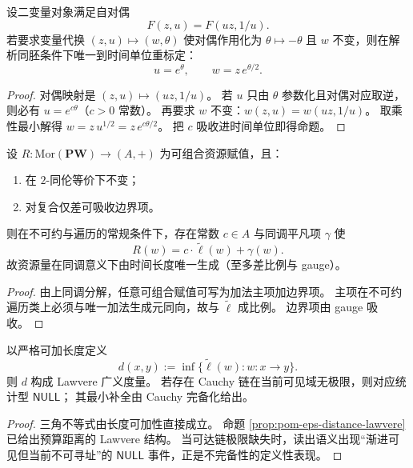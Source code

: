 \begin{proposition}\label{prop:xi-completed-coordinate-rigidity-time-reversal}
设二变量对象满足自对偶
\[
F(z,u)=F(uz,1/u).
\]
若要求变量代换 \((z,u)\mapsto (w,\theta)\) 使对偶作用化为
\(
\theta\mapsto-\theta
\)
且 \(w\) 不变，则在解析同胚条件下唯一到时间单位重标定：
\[
u=e^{\theta},
\qquad
w=z\,e^{\theta/2}.
\]
\end{proposition}

\begin{proof}
对偶映射是 \((z,u)\mapsto(uz,1/u)\)。
若 \(u\) 只由 \(\theta\) 参数化且对偶对应取逆，则必有 \(u=e^{c\theta}\)（\(c>0\) 常数）。
再要求 \(w\) 不变：\(w(z,u)=w(uz,1/u)\)。
取乘性最小解得 \(w=z\,u^{1/2}=z\,e^{c\theta/2}\)。
把 \(c\) 吸收进时间单位即得命题。
\end{proof}

\begin{theorem}\label{thm:xi-time-initial-generator-for-resources}
设 \(R:\mathrm{Mor}(\mathbf{PW})\to (A,+)\) 为可组合资源赋值，且：
\begin{enumerate}
  \item 在 \(2\)-同伦等价下不变；
  \item 对复合仅差可吸收边界项。
\end{enumerate}
则在不可约与遍历的常规条件下，存在常数 \(c\in A\) 与同调平凡项 \(\gamma\) 使
\[
R(w)=c\cdot\widetilde\ell(w)+\gamma(w).
\]
故资源量在同调意义下由时间长度唯一生成（至多差比例与 gauge）。
\end{theorem}

\begin{proof}
由上同调分解，任意可组合赋值可写为加法主项加边界项。
主项在不可约遍历类上必须与唯一加法生成元同向，故与 \(\widetilde\ell\) 成比例。
边界项由 gauge 吸收。
\end{proof}

\begin{proposition}\label{prop:xi-time-lawvere-null-incompleteness}
以严格可加长度定义
\[
d(x,y):=\inf\{\widetilde\ell(w):w:x\to y\}.
\]
则 \(d\) 构成 Lawvere 广义度量。
若存在 Cauchy 链在当前可见域无极限，则对应统计型 \(\mathsf{NULL}\)；
其最小补全由 Cauchy 完备化给出。
\end{proposition}

\begin{proof}
三角不等式由长度可加性直接成立。
命题 \ref{prop:pom-eps-distance-lawvere} 已给出预算距离的 Lawvere 结构。
当可达链极限缺失时，读出语义出现“渐进可见但当前不可寻址”的 \(\mathsf{NULL}\) 事件，正是不完备性的定义性表现。
\end{proof}

